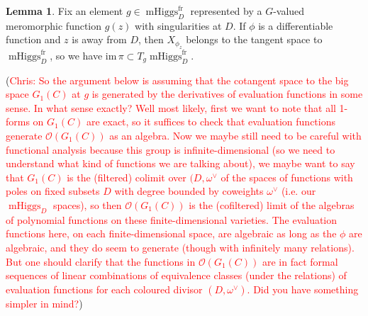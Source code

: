 \documentclass[11pt, oneside, reqno]{amsart}
\theoremstyle{definition} \newtheorem{definition}{Definition}[section]
\newtheorem{lemma}[definition]{Lemma}
\theoremstyle{definition} \newtheorem{remark}[definition]{Remark}
\theoremstyle{definition} \newtheorem{remarks}[definition]{Remarks}
\theoremstyle{definition} \newtheorem{question}[definition]{Question}
\theoremstyle{definition} \newtheorem*{note}{Note}
\theoremstyle{definition} \newtheorem{example}[definition]{Example}
\theoremstyle{definition} \newtheorem{examples}[definition]{Examples}
\newcommand{\OO}{\mathcal{O}}
\DeclareMathOperator{\mhiggs}{mHiggs}
\newcommand{\fr}{\mathrm{fr}}
\newcommand{\chris}[1]{(\textcolor{red}{Chris: #1})}
\begin{document}
\begin{lemma}\label{phitoX}
  Fix an element $g \in \mhiggs^{\fr}_{D}$ represented by a $G$-valued
  meromorphic function $g(z)$ with singularities at $D$.    If $\phi$ is a differentiable function and $z$ is away from $D$, then $X_{\phi_z}$
  belongs to the tangent space to $\mhiggs^{\fr}_{D}$, so we have $\mathrm{im} \, \pi \subset T_{g}\mhiggs^{\fr}_D$. 
\end{lemma}

\chris{So the argument below is assuming that the cotangent space to the big space $G_1(C)$ at $g$ is generated by the derivatives of evaluation functions in some sense.  In what sense exactly?  Well most likely, first we want to note that all 1-forms on $G_1(C)$ are exact, so it suffices to check that evaluation functions generate $\OO(G_1(C))$ as an algebra.  Now we maybe still need to be careful with functional analysis because this group is infinite-dimensional (so we need to understand what kind of functions we are talking about), we maybe want to say that $G_1(C)$ is the (filtered) colimit over $(D,\omega^\vee$ of the spaces of functions with poles on fixed subsets $D$ with degree bounded by coweights $\omega^\vee$ (i.e. our $\mhiggs_D$ spaces), so then $\OO(G_1(C))$ is the (cofiltered) limit of the algebras of polynomial functions on these finite-dimensional varieties. The evaluation functions here, on each finite-dimensional space, are algebraic as long as the $\phi$ are algebraic, and they do seem to generate (though with infinitely many relations).  But one should clarify that the functions in $\OO(G_1(C))$ are in fact formal sequences of linear combinations of equivalence classes (under the relations) of evaluation functions for each coloured divisor $(D, \omega^\vee)$.  Did you have something simpler in mind?}
\end{document}
